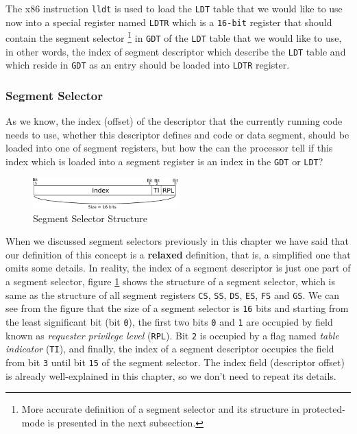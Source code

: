 The x86 instruction \lstinline!lldt! is used to load the \lstinline!LDT!
table that we would like to use now into a special register named
\lstinline!LDTR! which is a \lstinline!16-bit! register that should
contain the segment selector \footnote{More accurate definition of a
  segment selector and its structure in protected-mode is presented in
  the next subsection.} in \lstinline!GDT! of the \lstinline!LDT! table
that we would like to use, in other words, the index of segment
descriptor which describe the \lstinline!LDT! table and which reside in
\lstinline!GDT! as an entry should be loaded into \lstinline!LDTR!
register.

\subsubsection{Segment Selector}\label{segment-selector}

As we know, the index (offset) of the descriptor that the currently
running code needs to use, whether this descriptor defines and code or
data segment, should be loaded into one of segment registers, but how
the can the processor tell if this index which is loaded into a segment
register is an index in the \lstinline!GDT! or \lstinline!LDT!?

\begin{figure}
\centering
\includegraphics[width=0.50000\textwidth]{Figures/x86-ch/Fig17062021_0.png}
\caption{Segment Selector Structure}\label{fig:17062021_0}
\end{figure}

When we discussed segment selectors previously in this chapter we have
said that our definition of this concept is a \textbf{relaxed}
definition, that is, a simplified one that omits some details. In
reality, the index of a segment descriptor is just one part of a segment
selector, figure \ref{fig:17062021_0} shows the structure of a segment
selector, which is same as the structure of all segment registers
\lstinline!CS!, \lstinline!SS!, \lstinline!DS!, \lstinline!ES!,
\lstinline!FS! and \lstinline!GS!. We can see from the figure that the
size of a segment selector is \lstinline!16! bits and starting from the
least significant bit (bit \lstinline!0!), the first two bits
\lstinline!0! and \lstinline!1! are occupied by field known as
\emph{requester privilege level} (\lstinline!RPL!). Bit \lstinline!2! is
occupied by a flag named \emph{table indicator} (\lstinline!TI!), and
finally, the index of a segment descriptor occupies the field from bit
\lstinline!3! until bit \lstinline!15! of the segment selector. The
index field (descriptor offset) is already well-explained in this
chapter, so we don't need to repeat its details.

